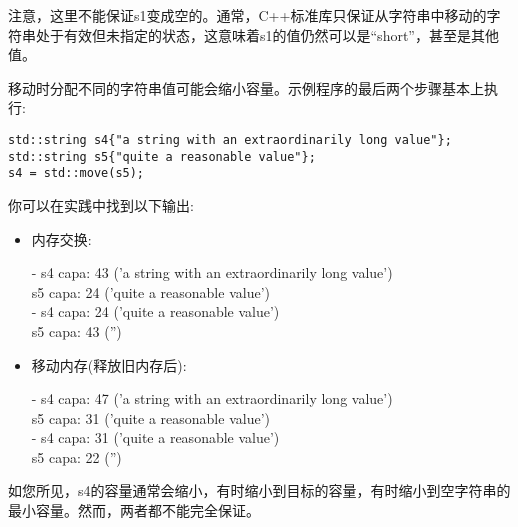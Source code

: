 注意，这里不能保证s1变成空的。通常，C++标准库只保证从字符串中移动的字符串处于有效但未指定的状态，这意味着s1的值仍然可以是“short”，甚至是其他值。\par

移动时分配不同的字符串值可能会缩小容量。示例程序的最后两个步骤基本上执行:\par

\begin{lstlisting}[caption={}]
std::string s4{"a string with an extraordinarily long value"};
std::string s5{"quite a reasonable value"};
s4 = std::move(s5);
\end{lstlisting}

你可以在实践中找到以下输出:\par

\begin{itemize}
	\item 内存交换:
	\begin{tcolorbox}[colback=white,colframe=black] 	
	- s4 capa: 43 ('a string with an extraordinarily long value') \\
	s5 capa: 24 ('quite a reasonable value') \\
	- s4 capa: 24 ('quite a reasonable value') \\
	s5 capa: 43 ('')
	\end{tcolorbox}	
	\item 移动内存(释放旧内存后):
	\begin{tcolorbox}[colback=white,colframe=black]
	- s4 capa: 47 ('a string with an extraordinarily long value') \\
	s5 capa: 31 ('quite a reasonable value') \\
	- s4 capa: 31 ('quite a reasonable value') \\
	s5 capa: 22 ('')
	\end{tcolorbox}	
\end{itemize}

如您所见，s4的容量通常会缩小，有时缩小到目标的容量，有时缩小到空字符串的最小容量。然而，两者都不能完全保证。\par













